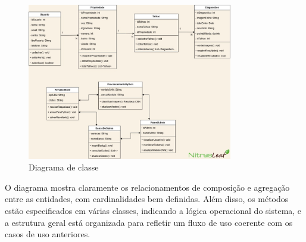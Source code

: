 \begin{figure}[H]
\centering
\caption{Diagrama de classe}%
\label{fig:diagrama-classe}
\includegraphics[width=0.8\textwidth]{Images/DiagramaDeClasses.jpg}
\end{figure}

O diagrama mostra claramente os relacionamentos de composição e agregação
entre as entidades, com cardinalidades bem definidas. Além disso, os métodos estão
especificados em várias classes, indicando a lógica operacional do sistema, e a
estrutura geral está organizada para refletir um fluxo de uso coerente com os casos de
uso anteriores.
\medskip